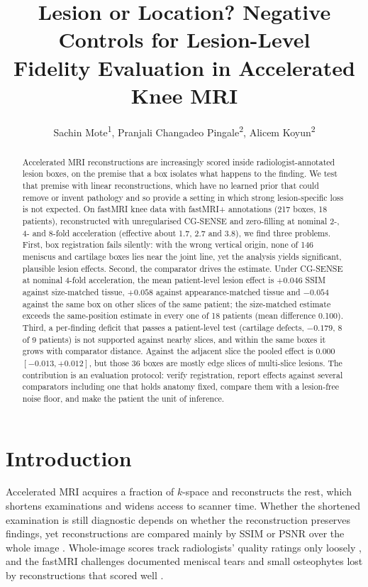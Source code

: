 \documentclass[letterpaper]{article} %
\title{Lesion or Location? Negative Controls for Lesion-Level\\Fidelity Evaluation in Accelerated Knee MRI}
\author{
    Sachin Mote\textsuperscript{\rm 1},
    Pranjali Changadeo Pingale\textsuperscript{\rm 2},
    Alicem Koyun\textsuperscript{\rm 2}
}
\begin{document}
\maketitle

\begin{abstract}
Accelerated MRI reconstructions are increasingly scored inside
radiologist-annotated lesion boxes, on the premise that a box isolates what
happens to the finding. We test that premise with linear reconstructions,
which have no learned prior that could remove or invent pathology and so
provide a setting in which strong lesion-specific loss is not expected. On
fastMRI knee data with fastMRI+ annotations (217 boxes, 18 patients),
reconstructed with unregularised CG-SENSE and zero-filling at nominal 2-, 4-
and 8-fold acceleration (effective about 1.7, 2.7 and 3.8), we find three
problems. First, box registration fails silently: with the wrong vertical
origin, none of 146 meniscus and cartilage boxes lies near the joint line, yet
the analysis yields significant, plausible lesion effects. Second, the
comparator drives the estimate. Under CG-SENSE at nominal 4-fold acceleration,
the mean patient-level lesion effect is $+0.046$ SSIM against size-matched
tissue, $+0.058$ against appearance-matched tissue and $-0.054$ against the
same box on other slices of the same patient; the size-matched estimate
exceeds the same-position estimate in every one of 18 patients (mean
difference 0.100). Third, a
per-finding deficit that passes a patient-level test (cartilage defects,
$-0.179$, 8 of 9 patients) is not supported against nearby slices, and within
the same boxes it grows with comparator distance. Against the adjacent slice
the pooled effect is $0.000$ $[-0.013, +0.012]$, but those 36 boxes are
mostly edge slices of multi-slice lesions. The contribution is an evaluation
protocol: verify registration, report effects against several comparators
including one that holds anatomy fixed, compare them with a lesion-free noise
floor, and make the patient the unit of inference.
\end{abstract}

\begin{links}
\end{links}

\section{Introduction}

Accelerated MRI acquires a fraction of $k$-space and reconstructs the rest,
which shortens examinations and widens access to scanner time. Whether the
shortened examination is still diagnostic depends on whether the
reconstruction preserves findings, yet reconstructions are compared mainly by
SSIM or PSNR over the whole image \citep{zbontar2018fastmri,muckley2021results}.
Whole-image scores track radiologists' quality ratings only loosely
\citep{mason2020iqm}, and the fastMRI challenges documented meniscal tears and
small osteophytes lost by reconstructions that scored well
\citep{knoll2020challenge}.
\end{document}
